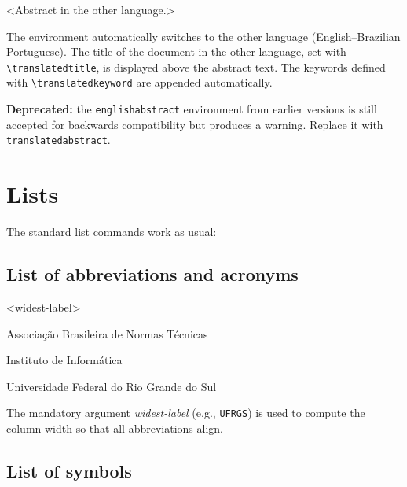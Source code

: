 \documentclass[11pt,a4paper]{article}
\newcommand{\cmd}[1]{\texttt{\textbackslash #1}}
\newcommand{\env}[1]{\texttt{#1}}
\newcommand{\meta}[1]{\textit{\textlangle#1\textrangle}}
\begin{document}
\begin{latex}
\begin{translatedabstract}
  <Abstract in the other language.>
\end{translatedabstract}
\end{latex}

The environment automatically switches to the other language
(English--Brazilian Portuguese).  The title of the document in the
other language, set with \cmd{translatedtitle}, is displayed above
the abstract text.  The keywords defined with \cmd{translatedkeyword}
are appended automatically.

\bigskip
\noindent\textbf{Deprecated:} the \env{englishabstract} environment
from earlier versions is still accepted for backwards compatibility
but produces a warning.  Replace it with \env{translatedabstract}.

\section{Lists}
\label{sec:lists}

The standard list commands work as usual:

\begin{latex}
\tableofcontents
\listoffigures
\listoftables
\end{latex}

\subsection{List of abbreviations and acronyms}

\begin{latex}
\begin{listofabbrv}{<widest-label>}
  \item[ABNT]  Associação Brasileira de Normas Técnicas
  \item[INF]   Instituto de Informática
  \item[UFRGS] Universidade Federal do Rio Grande do Sul
\end{listofabbrv}
\end{latex}

The mandatory argument \meta{widest-label} (e.g., \texttt{UFRGS}) is used
to compute the column width so that all abbreviations align.

\subsection{List of symbols}
\end{document}
